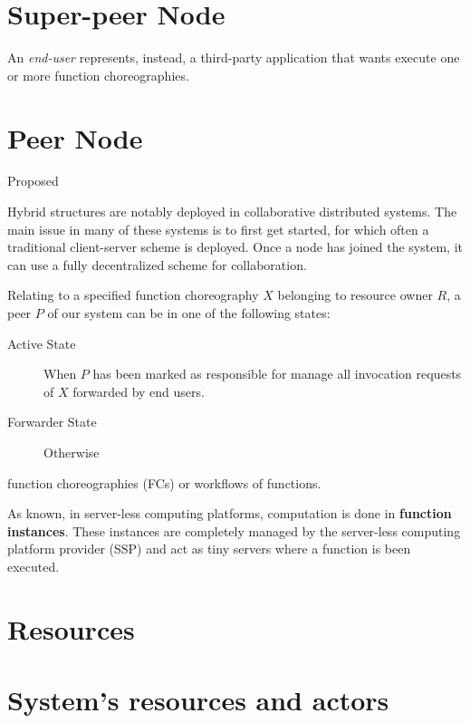 \documentclass[10pt,a4paper]{article}
\theoremstyle{definition}
\begin{document}
	




\tableofcontents
\newpage




\section{Super-peer Node}


An \textit{end-user} represents, instead, a third-party application that wants execute  one or more function choreographies.

\section{Peer Node}

Proposed 

Hybrid structures are notably deployed in collaborative distributed systems.
The main issue in many of these systems is to first get started, for which often
a traditional client-server scheme is deployed. Once a node has joined the
system, it can use a fully decentralized scheme for collaboration.


Relating to a specified function choreography $X$ belonging to resource owner $R$, a peer $P$ of our system can be in one of the following states:

\begin{description}
\item[Active State] When $P$ has been marked as responsible for manage all invocation requests of $X$ forwarded by end users.
\item[Forwarder State] Otherwise
\end{description}


function choreographies (FCs) or workflows of
functions. 

As known, in server-less computing platforms, computation is done in \textbf{function instances}. These instances are completely managed by the server-less computing platform provider (SSP) and act as tiny servers where a function is been executed.


\section{Resources}





\section{System's resources and actors}
\end{document}
